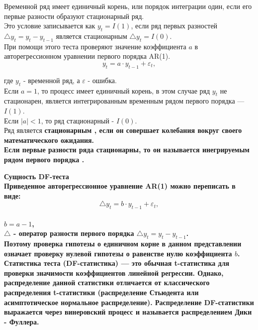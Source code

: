 \documentclass[12pt,a4paper]{paper}
\begin{document}
Временной ряд имеет единичный корень, или порядок интеграции один, если его первые разности образуют стационарный ряд.\\
Это условие записывается как $y_t=I(1)$, если ряд первых разностей $\triangle y_t = y_t-y _{t-1}$ является стационарным $\triangle y_t=I(0)$.\\

При помощи этого теста проверяют значение коэффициента $a$ в авторегрессионном уравнении первого порядка AR(1).\\

$$y_t =a\cdot y _{t-1}+ \varepsilon_t,$$

где $y_{t}$ - временной ряд, а $\varepsilon$ - ошибка. \\

Если $a=1$, то процесс имеет единичный корень, в этом случае ряд $y_{t}$ не стационарен, является интегрированным временным рядом первого порядка — $I(1)$.\\

Если $|a|<1$, то ряд стационарный - $I(0)$. \\

Ряд является \bfseries{стационарным} \mdseries, если он совершает колебания вокруг своего математического ожидания.\\

Если первые разности ряда стационарны, то он называется \bfseries{инегрируемым рядом первого порядка} \mdseries. 
\newpage


\bfseries{Сущность DF-теста} \mdseries\\

Приведенное авторегрессионное уравнение AR(1) можно переписать в виде:\\
$$\triangle y_{t}=b\cdot y_{{t-1}}+\varepsilon _{t},$$\\
 
$b=a-1$,\\

$\triangle$  - оператор разности первого порядка $\triangle y_{t}=y_{t}-y_{t-1}$.\\

Поэтому проверка гипотезы о единичном корне в данном представлении означает проверку нулевой гипотезы о равенстве нулю коэффициента $b$. \\

Статистика теста (DF-статистика) — это обычная t-статистика для проверки значимости коэффициентов линейной регрессии. Однако, распределение данной статистики отличается от классического распределения t-статистики (распределение Стьюдента или асимптотическое нормальное распределение). Распределение DF-статистики выражается через винеровский процесс и называется распределением Дики - Фуллера. \\
\end{document}
